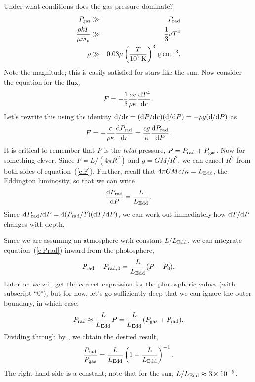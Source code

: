 Under what conditions does the gas pressure dominate?
\begin{eqnarray}
P_{\mathrm{gas}}&\gg& P_{\mathrm{rad}}\nonumber\\
\frac{\rho kT}{\mu m_\mathrm{u}} &\gg& \frac{1}{3}aT^{4}\nonumber\\
\rho &\gg& 0.03\mu \left(\frac{T}{10^{7}\,\mathrm{K}}\right)^{3}\,\mathrm{g}\,{\mathrm{c}\mathrm{m}}^{-3}.
\end{eqnarray}
Note the magnitude; this is easily satisfied for stars like the sun.  Now consider the equation for the flux,
\begin{equation}
F = -\frac{1}{3}\frac{ac}{\rho\kappa}\frac{\mathrm{d} T^{4}}{\mathrm{d} r}.
\end{equation}
Let's rewrite this using the identity $\mathrm{d}/\mathrm{d} r = (\mathrm{d} P/\mathrm{d} r)(\mathrm{d}/\mathrm{d} P) = -\rho g (\mathrm{d}/\mathrm{d} P)$ as
\begin{equation}\label{e.F}
F = -\frac{c}{\rho\kappa}\frac{\mathrm{d} P_{\mathrm{rad}}}{\mathrm{d} r} = \frac{cg}{\kappa}\frac{\mathrm{d} P_{\mathrm{rad}}}{\mathrm{d} P}.
\end{equation}
It is critical to remember that $P$ is the \emph{total} pressure, $P = P_{\mathrm{rad}} + P_{\mathrm{gas}}$. Now for something clever.  Since $F = L/(4\pi R^{2})$ and $g = GM/R^{2}$, we can cancel $R^{2}$ from both sides of equation~(\ref{e.F}). Further, recall that $4\pi GMc/\kappa = L_{\mathrm{Edd}}$, the Eddington luminosity, so that we can write
\begin{equation}\label{e.Prad}
\frac{\mathrm{d} P_{\mathrm{rad}}}{\mathrm{d} P} = \frac{L}{L_{\mathrm{Edd}}}.
\end{equation}
Since $\mathrm{d} P_{\mathrm{rad}}/\mathrm{d} P = 4 (P_{\mathrm{rad}}/T) (\mathrm{d} T/\mathrm{d} P)$, we can work out immediately how $\mathrm{d} T/\mathrm{d} P$ changes with depth.

Since we are assuming an atmosphere with constant $L/L_{\mathrm{Edd}}$, we can integrate equation~(\ref{e.Prad}) inward from the photosphere,
\begin{equation}
P_{\mathrm{rad}} - P_{\mathrm{rad,0}} = \frac{L}{L_{\mathrm{Edd}}}(P-P_{0}).
\end{equation}
Later on we will get the correct expression for the photospheric values (with subscript ``0''), but for now, let's go sufficiently deep that we can ignore the outer boundary, in which case,
\begin{equation}
P_{\mathrm{rad}} \approx \frac{L}{L_{\mathrm{Edd}}}P = \frac{L}{L_{\mathrm{Edd}}}(P_{\mathrm{gas}} + P_{\mathrm{rad}}).
\end{equation}
Dividing through by \Pgas, we obtain the desired result,
\begin{equation}
\frac{P_{\mathrm{rad}}}{P_{\mathrm{gas}}} = \frac{L}{L_{\mathrm{Edd}}}\left(1-\frac{L}{L_{\mathrm{Edd}}}\right)^{-1}.
\end{equation}
The right-hand side is a constant; note that for the sun, $L/L_{\mathrm{Edd}} \approx  3\times 10^{-5}$.

